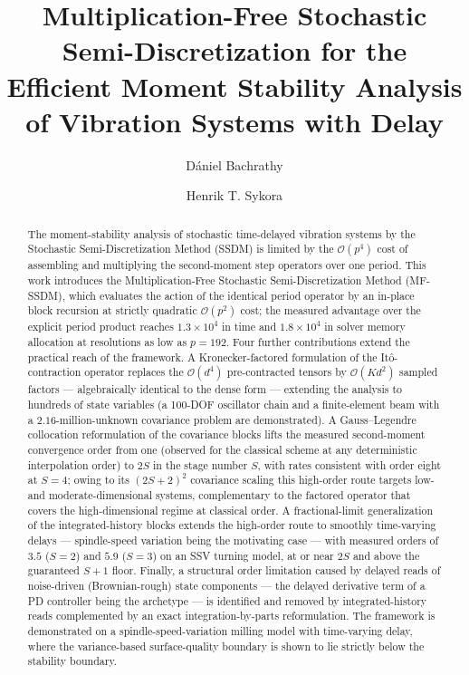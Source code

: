 \documentclass[preprint,12pt]{elsarticle}
\begin{document}
\begin{frontmatter}

\title{Multiplication-Free Stochastic Semi-Discretization for the Efficient Moment Stability Analysis of Vibration Systems with Delay}

\author[1]{D\'aniel Bachrathy}
\author[1]{Henrik T. Sykora}

\address[1]{Department of Applied Mechanics, Faculty of Mechanical Engineering, Budapest University of Technology and Economics, M\H{u}egyetem rkp. 3., H-1111 Budapest, Hungary}


\begin{abstract}
The moment-stability analysis of stochastic time-delayed vibration systems by the Stochastic Semi-Discretization Method (SSDM) is limited by the $\mathcal{O}(p^4)$ cost of assembling and multiplying the second-moment step operators over one period. This work introduces the Multiplication-Free Stochastic Semi-Discretization Method (MF-SSDM), which evaluates the action of the identical period operator by an in-place block recursion at strictly quadratic $\mathcal{O}(p^2)$ cost; the measured advantage over the explicit period product reaches $1.3\times10^4$ in time and $1.8\times10^4$ in solver memory allocation at resolutions as low as $p=192$. Four further contributions extend the practical reach of the framework. A Kronecker-factored formulation of the It\^o-contraction operator replaces the $\mathcal{O}(d^4)$ pre-contracted tensors by $\mathcal{O}(K d^2)$ sampled factors --- algebraically identical to the dense form --- extending the analysis to hundreds of state variables (a 100-DOF oscillator chain and a finite-element beam with a $2.16$-million-unknown covariance problem are demonstrated). A Gauss--Legendre collocation reformulation of the covariance blocks lifts the measured second-moment convergence order from one (observed for the classical scheme at any deterministic interpolation order) to $2S$ in the stage number $S$, with rates consistent with order eight at $S=4$; owing to its $(2S+2)^2$ covariance scaling this high-order route targets low- and moderate-dimensional systems, complementary to the factored operator that covers the high-dimensional regime at classical order. A fractional-limit generalization of the integrated-history blocks extends the high-order route to smoothly time-varying delays --- spindle-speed variation being the motivating case --- with measured orders of $3.5$ ($S{=}2$) and $5.9$ ($S{=}3$) on an SSV turning model, at or near $2S$ and above the guaranteed $S{+}1$ floor. Finally, a structural order limitation caused by delayed reads of noise-driven (Brownian-rough) state components --- the delayed derivative term of a PD controller being the archetype --- is identified and removed by integrated-history reads complemented by an exact integration-by-parts reformulation. The framework is demonstrated on a spindle-speed-variation milling model with time-varying delay, where the variance-based surface-quality boundary is shown to lie strictly below the stability boundary.
\end{abstract}


\end{frontmatter}
\end{document}
